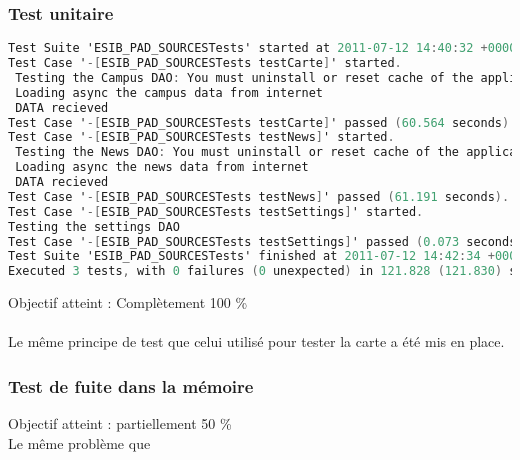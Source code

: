 		 		 \subsubsection*{Test unitaire}
		 		 \begin{lstlisting}[language=C,caption = Log des test unitaires]
Test Suite 'ESIB_PAD_SOURCESTests' started at 2011-07-12 14:40:32 +0000
Test Case '-[ESIB_PAD_SOURCESTests testCarte]' started.
 Testing the Campus DAO: You must uninstall or reset cache of the application before testing
 Loading async the campus data from internet
 DATA recieved
Test Case '-[ESIB_PAD_SOURCESTests testCarte]' passed (60.564 seconds).
Test Case '-[ESIB_PAD_SOURCESTests testNews]' started.
 Testing the News DAO: You must uninstall or reset cache of the application before testing
 Loading async the news data from internet
 DATA recieved
Test Case '-[ESIB_PAD_SOURCESTests testNews]' passed (61.191 seconds).
Test Case '-[ESIB_PAD_SOURCESTests testSettings]' started.
Testing the settings DAO
Test Case '-[ESIB_PAD_SOURCESTests testSettings]' passed (0.073 seconds).
Test Suite 'ESIB_PAD_SOURCESTests' finished at 2011-07-12 14:42:34 +0000.
Executed 3 tests, with 0 failures (0 unexpected) in 121.828 (121.830) seconds
		 		 \end{lstlisting}
		 		Objectif atteint : {\color{green}Complètement 100 \% \CheckedBox}\\
		 		\\
		 		Le même principe de test que celui utilisé pour tester la carte a été mis en place.
		 		 \subsubsection*{Test de fuite dans la mémoire}
		 		 Objectif atteint : {\color{red}partiellement 50 \% \CheckedBox}\\
		 		Le même problème que 